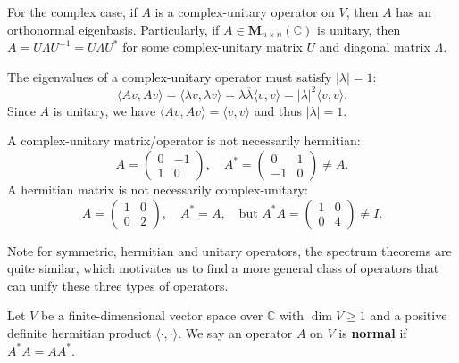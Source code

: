 \documentclass{ctexart}
\newcommand{\M}{\mathbf{M}}
\newcommand{\C}{\mathbb{C}}
\begin{document}
    \begin{mythm}
        For the complex case, if $A$ is a complex-unitary operator on $V$, then $A$ has an orthonormal eigenbasis. Particularly, if $A\in \M_{n\times n}(\C)$ is unitary, then $A=U\Lambda U^{-1} = U \Lambda U^*$ for some complex-unitary matrix $U$ and diagonal matrix $\Lambda$.
    \end{mythm}
    \begin{myrmk}
        The eigenvalues of a complex-unitary operator must satisfy $|\lambda|=1$:
        $$ \langle A v, A v \rangle = \langle \lambda v, \lambda v \rangle = \lambda \overline{\lambda} \langle v, v \rangle = |\lambda|^2 \langle v, v \rangle. $$
         Since $A$ is unitary, we have $\langle A v, A v \rangle = \langle v, v \rangle$ and thus $|\lambda|=1$.
    \end{myrmk}
    \begin{myrmk}
        A complex-unitary matrix/operator is not necessarily hermitian:
        $$ A = \begin{pmatrix}
            0 & -1 \\
            1 & 0
        \end{pmatrix}, \quad A^* = \begin{pmatrix}
            0 & 1 \\
            -1 & 0
        \end{pmatrix} \ne A. $$
        A hermitian matrix is not necessarily complex-unitary:
        $$ A = \begin{pmatrix}
            1 & 0 \\
            0 & 2
        \end{pmatrix}, \quad A^* = A, \quad \text{but } A^* A = \begin{pmatrix}
            1 & 0 \\
            0 & 4
        \end{pmatrix} \ne I. $$
    \end{myrmk}
    \begin{myrmk}
        Note for symmetric, hermitian and unitary operators, the spectrum theorems are quite similar, which motivates us to find a more general class of operators that can unify these three types of operators.
    \end{myrmk}
    \begin{mydef}
        Let $V$ be a finite-dimensional vector space over $\C$ with $\dim V\ge 1$ and a positive definite hermitian product $\langle \cdot, \cdot \rangle$. We say an operator $A$ on $V$ is \textbf{normal} if $A^* A = A A^*$.
    \end{mydef}
\end{document}
